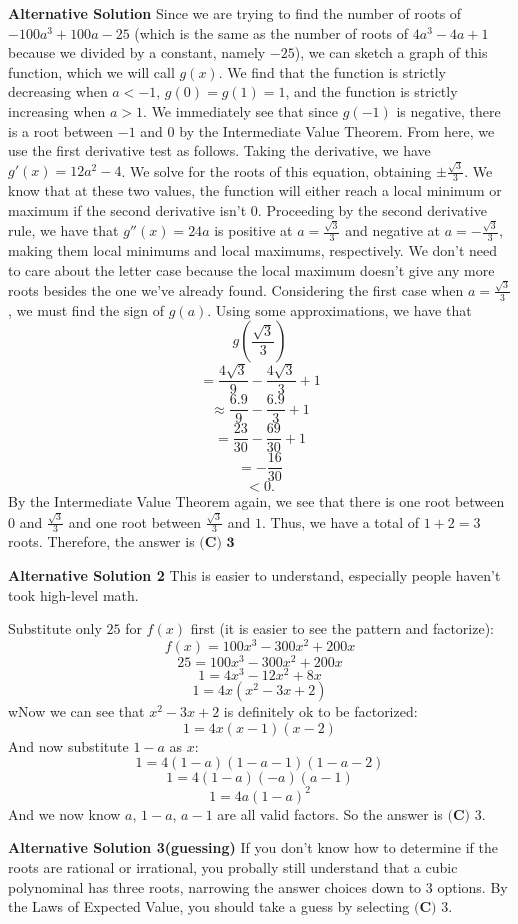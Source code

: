 \begin{enumerate}
 \textbf{Alternative Solution} Since we are trying to find the number of roots of $-100a^3+100a-25$ (which is the same as the number of roots of $4a^3-4a+1$ because we divided by a constant, namely $-25$), we can sketch a graph of this function, which we will call $g(x)$. We find that the function is strictly decreasing when $a<-1$, $g(0)=g(1)=1$, and the function is strictly increasing when $a>1$. We immediately see that since $g(-1)$ is negative, there is a root between $-1$ and $0$ by the Intermediate Value Theorem. From here, we use the first derivative test as follows. Taking the derivative, we have $g'(x)=12a^2-4$. We solve for the roots of this equation, obtaining $\pm \frac{\sqrt{3}}{3}$. We know that at these two values, the function will either reach a local minimum or maximum if the second derivative isn't $0$. Proceeding by the second derivative rule, we have that $g''(x)=24a$ is positive at $a=\frac{\sqrt{3}}{3}$ and negative at $a=-\frac{\sqrt{3}}{3}$, making them local minimums and local maximums, respectively. We don't need to care about the letter case because the local maximum doesn't give any more roots besides the one we've already found. Considering the first case when $a=\frac{\sqrt{3}}{3}$, we must find the sign of $g(a)$. Using some approximations, we have that 
 \[g(\frac{\sqrt{3}}{3})\]
 \[=\frac{4 \sqrt{3}}{9} - \frac{4 \sqrt{3}}{3} + 1\]
 \[\approx \frac{6.9}{9} - \frac{6.9}{3} +1\]
 \[= \frac{23}{30} - \frac{69}{30} + 1\]
 \[= -\frac{16}{30}\]
 \[<0.\]By the Intermediate Value Theorem again, we see that there is one root between $0$ and $\frac{\sqrt{3}}{3}$ and one root between $\frac{\sqrt{3}}{3}$ and $1$. Thus, we have a total of $1+2=3$ roots. Therefore, the answer is $\boxed{\textbf{(C) 3}}$

 \textbf{Alternative Solution 2} This is easier to understand, especially people haven't took high-level math. 

 Substitute only $25$ for $f(x)$ first (it is easier to see the pattern and factorize): 
 \[f(x) = 100x^3 - 300x^2 + 200x\]
 \[25 = 100x^3 - 300x^2 + 200x\]
 \[1 = 4x^3 - 12x^2 + 8x\]
 \[1 = 4x (x^2 - 3x + 2)\]wNow we can see that $x^2 - 3x + 2$ is definitely ok to be factorized:
 \[1 = 4x (x - 1) (x - 2)\]And now substitute $1 - a$ as $x$:
 \[1 = 4 (1 - a) (1 - a -1) (1 - a - 2)\]
 \[1 = 4 (1 - a) (-a) (a - 1)\]
 \[1 = 4a (1 - a)^2\]And we now know $a$, $1 - a$, $a - 1$ are all valid factors. So the answer is $\boxed{\textbf{(C) } 3}$. 

 \textbf{Alternative Solution 3(guessing)} If you don't know how to determine if the roots are rational or irrational, you probally still understand that a cubic polynominal has three roots, narrowing the answer choices down to 3 options.  By the Laws of Expected Value, you should take a guess by selecting $\boxed{\textbf{(C) } 3}$. 


\end{enumerate}
